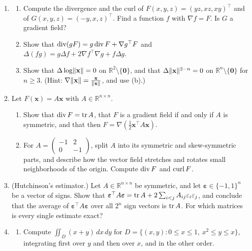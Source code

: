 \begin{enumerate}[leftmargin=*]
\begin{enumerate}[label=(\alph*)]
    \end{enumerate}
    \item \begin{enumerate}[label=(\alph*)]
        \item Compute the divergence and the curl of $F(x, y, z) = (yz, xz, xy)^\top$ and of $G(x, y, z) = (-y, x, z)^\top$. Find a function $f$ with $\nabla f = F$. Is $G$ a gradient field?
        \item Show that $\operatorname{div}(gF) = g\operatorname{div} F + \nabla g^\top F$ and $\Delta(fg) = g\Delta f + 2\nabla f^\top\nabla g + f\Delta g$.
        \item Show that $\Delta\log\lVert \mathbf{x} \rVert = 0$ on $\mathbb{R}^2 \setminus \{\mathbf{0}\}$, and that $\Delta\lVert \mathbf{x} \rVert^{2-n} = 0$ on $\mathbb{R}^n \setminus \{\mathbf{0}\}$ for $n \geq 3$. (Hint: $\nabla\lVert \mathbf{x} \rVert = \frac{\mathbf{x}}{\lVert \mathbf{x} \rVert}$, and use (b).)
    \end{enumerate}
    \item Let $F(\mathbf{x}) = A\mathbf{x}$ with $A \in \mathbb{R}^{n \times n}$.
    \begin{enumerate}[label=(\alph*)]
        \item Show that $\operatorname{div} F = \operatorname{tr} A$, that $F$ is a gradient field if and only if $A$ is symmetric, and that then $F = \nabla(\frac{1}{2}\mathbf{x}^\top A\mathbf{x})$.
        \item For $A = \begin{pmatrix} -1 & 2 \\ 0 & -1 \end{pmatrix}$, split $A$ into its symmetric and skew-symmetric parts, and describe how the vector field stretches and rotates small neighborhoods of the origin. Compute $\operatorname{div} F$ and $\operatorname{curl} F$.
    \end{enumerate}
    \item\label{L3-ex3:hutchinson} (Hutchinson's estimator.) Let $A \in \mathbb{R}^{n \times n}$ be symmetric, and let $\boldsymbol{\varepsilon} \in \{-1, 1\}^n$ be a vector of signs. Show that $\boldsymbol{\varepsilon}^\top A\boldsymbol{\varepsilon} = \operatorname{tr} A + 2\sum_{i < j} A_{ij}\varepsilon_i\varepsilon_j$, and conclude that the average of $\boldsymbol{\varepsilon}^\top A\boldsymbol{\varepsilon}$ over all $2^n$ sign vectors is $\operatorname{tr} A$. For which matrices is every single estimate exact?
    \item \begin{enumerate}[label=(\alph*)]
        \item Compute $\iint_D (x + y)\, dx\, dy$ for $D = \{(x, y) : 0 \leq x \leq 1, \ x^2 \leq y \leq x\}$, integrating first over $y$ and then over $x$, and in the other order.

\end{enumerate}
\end{enumerate}
